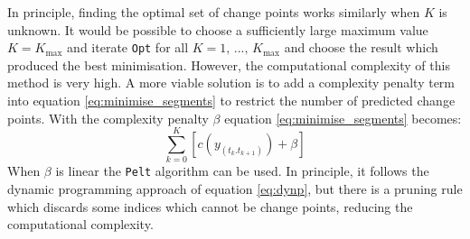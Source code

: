 In principle, finding the optimal set of change points works similarly when $K$ is unknown. It would be possible to choose a sufficiently large maximum value $K=K_{\text{max}}$ and iterate \texttt{Opt} for all $K=1\text{, ..., }K_{\text{max}}$ and choose the result which produced the best minimisation. However, the computational complexity of this method is very high. A more viable solution is to add a complexity penalty term into equation \ref{eq:minimise_segments} to restrict the number of predicted change points. With the complexity penalty $\beta$ equation \ref{eq:minimise_segments} becomes:
\begin{equation} %
  \sum_{k=0}^{K} \left[ c(y_{ (t_k . t_{k+1} )}) + \beta \right]
  \label{eq:minimise_segments_pen}
\end{equation}
When $\beta$ is linear the \texttt{Pelt} algorithm can be used. In principle, it follows the dynamic programming approach of equation \ref{eq:dynp}, but there is a pruning rule which discards some indices which cannot be change points, reducing the computational complexity. %

